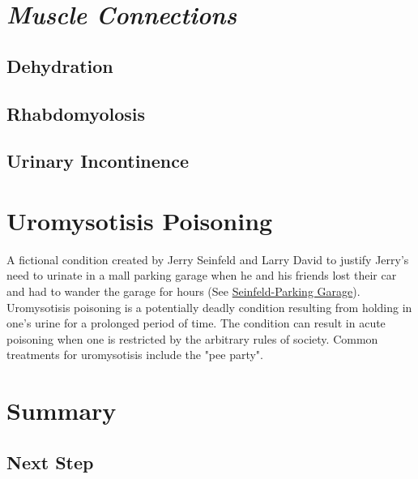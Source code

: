 \section{\textit{Muscle Connections}}

\subsection{Dehydration}

\subsection{Rhabdomyolosis}

\subsection{Urinary Incontinence}

\section{Uromysotisis Poisoning}

A fictional condition created by Jerry Seinfeld and Larry David to justify Jerry's need to urinate in a mall parking garage when he and his friends lost their car and had to wander the garage for hours (See \href{https://www.youtube.com/watch?v=OG6b7KJ1Ah0}{Seinfeld-Parking Garage}). Uromysotisis poisoning is a potentially deadly condition resulting from holding in one's urine for a prolonged period of time. The condition can result in acute poisoning when one is restricted by the arbitrary rules of society. Common treatments for uromysotisis include the "pee party".

\section{Summary}

\subsection{Next Step}

\printbibliography[heading=subbibintoc]